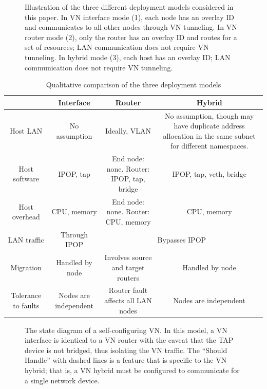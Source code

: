 \clearpage

\begin{figure}[ht]
\centering
{}
\caption[Three VN Approaches]{Illustration of the three different deployment
models considered in this paper. In VN interface mode (1), each node has an
overlay ID and communicates to all other nodes through VN tunneling. In VN
router mode (2), only the router has an overlay ID and routes for a set of
resources; LAN communication does not require VN tunneling. In hybrid mode
(3), each host has an overlay ID; LAN communication does not require VN
tunneling.}
\label{fig:three_models}
\end{figure}

\begin{table}[ht]
\centering
\begin{tabular*}{0.75\textwidth}{|c||c|c|c|} \hline
 & Interface & Router & Hybrid \\ \hline\hline
Host LAN 
& 
No assumption 
& 
Ideally, VLAN
&
No assumption, though may have duplicate address allocation in the same subnet
for different namespaces.\footnotemark[2]
\\ \hline
Host software
&
IPOP, tap
&
End node: none. Router: IPOP, tap, bridge 
&
IPOP, tap, veth, bridge \\ \hline
Host overhead
&
CPU, memory
& 
End node: none. Router: CPU, memory
&
CPU, memory \\ \hline
LAN traffic
&
Through IPOP
&
\multicolumn{2}{c|}{Bypasses IPOP} \\ \hline
Migration
&
Handled by node
&
Involves source and target routers
&
Handled by node \\ \hline
Tolerance to faults
&
Nodes are independent
&
Router fault affects all LAN nodes
&
Nodes are independent \\ \hline
\end{tabular*}
\caption{Qualitative comparison of the three deployment models}
\label{tab:three_models}
\end{table}

\begin{figure}[ht]
\centering
{}
\caption[The state diagram of a self-configuring VN.]{The state diagram of a
self-configuring VN.  In this model, a VN interface is identical to a VN router
with the caveat that the TAP device is not bridged, thus isolating the VN
traffic.  The ``Should Handle'' with dashed lines is a feature that is specific
to the VN hybrid; that is, a VN hybrid must be configured to communicate for a
single network device.}
\label{fig:vn}
\end{figure}

